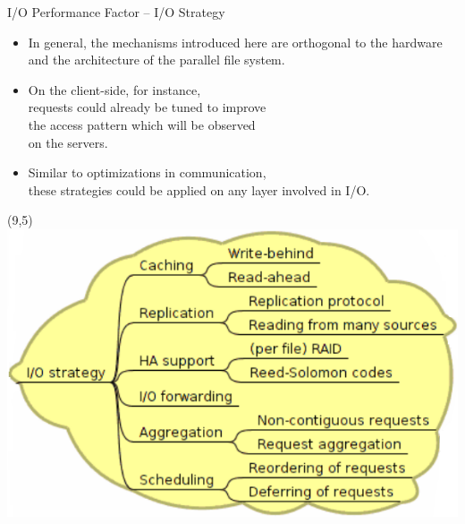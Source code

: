 \documentclass[compress,11pt,xcolor=svgnames,aspectratio=169]{beamer}
\begin{document}
\begin{frame}[fragile]{I/O Performance Factor -- I/O Strategy}

\begin{itemize}
\setlength\itemsep{0.5cm}

  \item In general, the mechanisms introduced here are orthogonal to the hardware and the architecture of the parallel file system.

  \item On the client-side, for instance, \\
  requests could already be tuned to improve \\
  the access pattern which will be observed \\
  on the servers.

  \item Similar to optimizations in communication, \\
  these strategies could be applied on any layer involved in I/O.

\end{itemize}

\begin{textblock}{0}(9,5)
   \includegraphics[scale=0.4]{fig/tree-io-strat}
\end{textblock}


\nocite{SOPPOAASLK13}

\end{frame}
\end{document}
